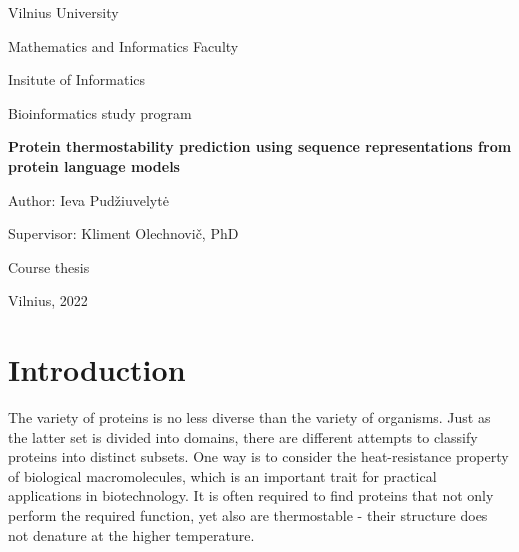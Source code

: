 \documentclass[12pt]{article}
\begin{document}
	\begin{center}

	    \vspace*{1cm}
	    \Large
	    Vilnius University

		Mathematics and Informatics Faculty

		Insitute of Informatics 

		Bioinformatics study program
	    
        \vspace*{4cm}
        \Large
		\textbf{Protein thermostability prediction using 
		sequence representations from protein 
		language models}

	\end{center}

	\begin{flushright}

		\vspace*{2cm}
        \large
        Author: Ieva Pudžiuvelytė

        Supervisor: Kliment Olechnovič, PhD 
        
	\end{flushright}

	\begin{center}
		\vspace*{4cm}
        \large
        Course thesis
        
        \vspace*{2cm}
        \large
        Vilnius, 2022
	\end{center}
	
	\newpage

	\tableofcontents

	\newpage
	
	\Large
	\section{Introduction}

    \vspace*{1cm}
        
	\normalsize

	The variety of proteins is no less diverse than the variety of organisms. 
	Just as the latter set is divided into domains, there are different 
	attempts to classify proteins into distinct subsets. One way is to 
	consider the heat-resistance property of biological macromolecules, which 
	is an important trait for practical applications in biotechnology. It is 
	often required to find proteins that not only perform the required
	function, yet also are thermostable - their structure does not denature 
	at the higher temperature.
\end{document}
